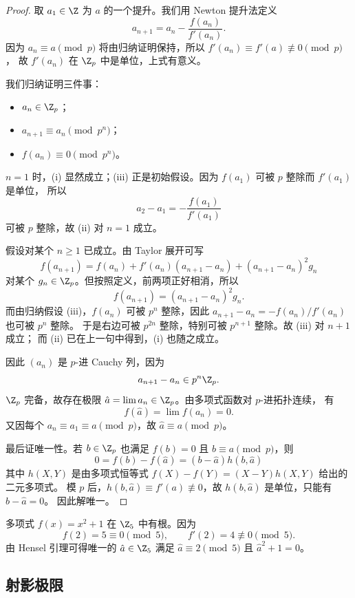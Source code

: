 \begin{proof}
取 $a_1\in\Z$ 为 $a$ 的一个提升。我们用 Newton 提升法定义
\begin{equation}
  a_{n+1}=a_n-\frac{f(a_n)}{f'(a_n)}.
\end{equation}
因为 $a_n\equiv a\pmod p$ 将由归纳证明保持，所以 $f'(a_n)\equiv f'(a)\not\equiv 0\pmod p$，
故 $f'(a_n)$ 在 $\Z_p$ 中是单位，上式有意义。

我们归纳证明三件事：
\begin{itemize}
  \item[(i)] $a_n\in \Z_p$；
  \item[(ii)] $a_{n+1}\equiv a_n\pmod{p^n}$；
  \item[(iii)] $f(a_n)\equiv 0\pmod{p^n}$。
\end{itemize}

$n=1$ 时，(i) 显然成立；(iii) 正是初始假设。因为 $f(a_1)$ 可被 $p$ 整除而 $f'(a_1)$ 是单位，
所以
\[
  a_2-a_1=-\frac{f(a_1)}{f'(a_1)}
\]
可被 $p$ 整除，故 (ii) 对 $n=1$ 成立。

假设对某个 $n\ge 1$ 已成立。由 Taylor 展开可写
\[
  f(a_{n+1})=f(a_n)+f'(a_n)(a_{n+1}-a_n)+(a_{n+1}-a_n)^2 g_n
\]
对某个 $g_n\in \Z_p$。但按照定义，前两项正好相消，所以
\[
  f(a_{n+1})=(a_{n+1}-a_n)^2 g_n.
\]
而由归纳假设 (iii)，$f(a_n)$ 可被 $p^n$ 整除，因此 $a_{n+1}-a_n=-f(a_n)/f'(a_n)$ 也可被 $p^n$ 整除。
于是右边可被 $p^{2n}$ 整除，特别可被 $p^{n+1}$ 整除。故 (iii) 对 $n+1$ 成立；
而 (ii) 已在上一句中得到，(i) 也随之成立。

因此 $(a_n)$ 是 $p$-进 Cauchy 列，因为
\[
  a_{n+1}-a_n\in p^n\Z_p.
\]
$\Z_p$ 完备，故存在极限 $\hat a=\lim a_n\in \Z_p$。由多项式函数对 $p$-进拓扑连续，
有
\[
  f(\hat a)=\lim f(a_n)=0.
\]
又因每个 $a_n\equiv a_1\equiv a\pmod p$，故 $\hat a\equiv a\pmod p$。

最后证唯一性。若 $b\in\Z_p$ 也满足 $f(b)=0$ 且 $b\equiv a\pmod p$，则
\[
  0=f(b)-f(\hat a)=(b-\hat a)h(b,\hat a)
\]
其中 $h(X,Y)$ 是由多项式恒等式 $f(X)-f(Y)=(X-Y)h(X,Y)$ 给出的二元多项式。
模 $p$ 后，$h(b,\hat a)\equiv f'(a)\not\equiv 0$，故 $h(b,\hat a)$ 是单位，只能有 $b-\hat a=0$。
因此解唯一。
\end{proof}

\begin{example}
多项式 $f(x)=x^2+1$ 在 $\Z_5$ 中有根。因为
\[
  f(2)=5\equiv 0\pmod 5,
  \qquad f'(2)=4\not\equiv 0\pmod 5.
\]
由 Hensel 引理可得唯一的 $\hat a\in\Z_5$ 满足 $\hat a\equiv 2\pmod 5$ 且 $\hat a^2+1=0$。
\end{example}

\subsection{射影极限}

